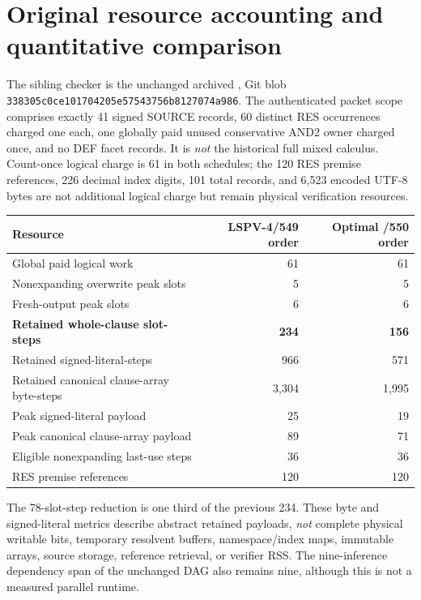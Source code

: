 \documentclass[11pt]{article}
\begin{document}
\section*{Original resource accounting and quantitative comparison}
The sibling checker is the unchanged archived
,
Git blob \texttt{338305c0ce101704205e57543756b8127074a986}.
The authenticated packet scope comprises exactly 41 signed SOURCE records, 60 distinct RES occurrences charged one each, one globally paid unused conservative AND2 owner charged once, and no DEF facet records. It is \emph{not} the historical full mixed calculus. Count-once logical charge is 61 in both schedules; the 120 RES premise references, 226 decimal index digits, 101 total records, and 6,523 encoded UTF-8 bytes are not additional logical charge but remain physical verification resources.

\begin{center}
\begin{tabular}{lrr}
\toprule
Resource & LSPV-4/549 order & Optimal /550 order\\
\midrule
Global paid logical work & 61 & 61\\
Nonexpanding overwrite peak slots & 5 & 5\\
Fresh-output peak slots & 6 & 6\\
\textbf{Retained whole-clause slot-steps} & \textbf{234} & \textbf{156}\\
Retained signed-literal-steps & 966 & 571\\
Retained canonical clause-array byte-steps & 3,304 & 1,995\\
Peak signed-literal payload & 25 & 19\\
Peak canonical clause-array payload & 89 & 71\\
Eligible nonexpanding last-use steps & 36 & 36\\
RES premise references & 120 & 120\\
\bottomrule
\end{tabular}
\end{center}

The 78-slot-step reduction is one third of the previous 234. These byte and signed-literal metrics describe abstract retained payloads, \emph{not} complete physical writable bits, temporary resolvent buffers, namespace/index maps, immutable arrays, source storage, reference retrieval, or verifier RSS. The nine-inference dependency span of the unchanged DAG also remains nine, although this is not a measured parallel runtime.
\end{document}
